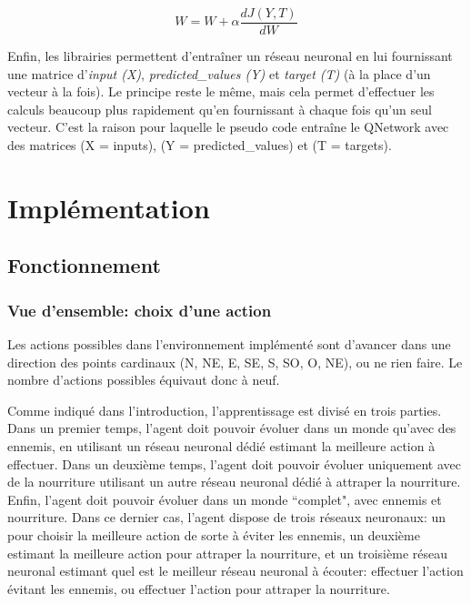 \documentclass[11pt,a4paper]{report}
\begin{document}
  $$W = W + \alpha \frac{dJ(Y,T)}{dW}$$
  
  \par Enfin, les librairies permettent d’entraîner un réseau neuronal en lui fournissant une matrice d'\textit{input (X)}, \textit{predicted\_values (Y)} et \textit{target (T)} (à la place d'un vecteur à la fois). Le principe reste le même, mais cela permet d'effectuer les calculs beaucoup plus rapidement qu'en fournissant à chaque fois qu'un seul vecteur. C'est la raison pour laquelle le pseudo code entraîne le QNetwork avec des matrices (X = inputs), (Y = predicted\_values) et (T = targets). 
  
  \chapter{Implémentation}
  
  \section{Fonctionnement}
  
  \subsection{Vue d'ensemble: choix d'une action}
  
  \par Les actions possibles dans l'environnement implémenté sont d'avancer dans une direction des points cardinaux (N, NE, E, SE, S, SO, O, NE), ou ne rien faire. Le nombre d'actions possibles équivaut donc à neuf. 

  \par Comme indiqué dans l'introduction, l'apprentissage est divisé en trois parties. Dans un premier temps, l'agent doit pouvoir évoluer dans un monde qu'avec des ennemis, en utilisant un réseau neuronal dédié estimant la meilleure action à effectuer. Dans un deuxième temps, l'agent doit pouvoir évoluer uniquement avec de la nourriture utilisant un autre réseau neuronal dédié à attraper la nourriture. Enfin, l'agent doit pouvoir évoluer dans un monde ``complet", avec ennemis et nourriture. Dans ce dernier cas, l'agent dispose de trois réseaux neuronaux: un pour choisir la meilleure action de sorte à éviter les ennemis, un deuxième estimant la meilleure action pour attraper la nourriture, et un troisième réseau neuronal estimant quel est le meilleur réseau neuronal à écouter: effectuer l'action évitant les ennemis, ou effectuer l'action pour attraper la nourriture. 
  
\end{document}
